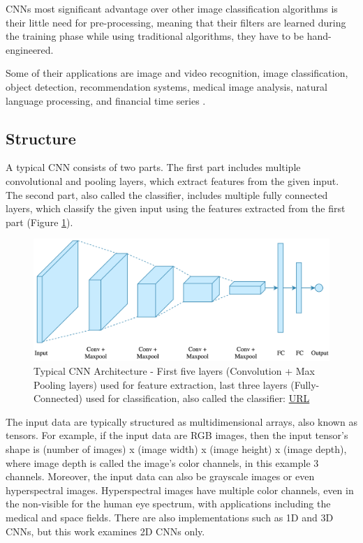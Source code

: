 CNNs most significant advantage over other image classification algorithms is their little need for pre-processing, meaning that their filters are learned during the training phase while using traditional algorithms, they have to be hand-engineered.

Some of their applications are image and video recognition, image classification, object detection, recommendation systems, medical image analysis, natural language processing, and financial time series \cite{Convolutional-neural-networks-wikipedia}.

\subsection{Structure}
A typical CNN consists of two parts. The first part includes multiple convolutional and pooling layers, which extract features from the given input. The second part, also called the classifier, includes multiple fully connected layers, which classify the given input using the features extracted from the first part (Figure \ref{fig:typical-cnn-architecture}).

\begin{figure} [ht]
	\centering
	\includegraphics[width=\textwidth]{Images/typical-cnn-architecture.png}
	\decoRule
	\caption[Typical CNN Architecture]{Typical CNN Architecture - First five layers (Convolution + Max Pooling layers) used for feature extraction, last three layers (Fully-Connected) used for classification, also called the classifier: \href{https://www.kaggle.com/mauddib/digit-recogniser-tutorial-using-a-cnn-tensorflow}{URL}}
	\label{fig:typical-cnn-architecture}
\end{figure}

The input data are typically structured as multidimensional arrays, also known as tensors. For example, if the input data are RGB images, then the input tensor's shape is (number of images) x (image width) x (image height) x (image depth), where image depth is called the image's color channels, in this example 3 channels. Moreover, the input data can also be grayscale images or even hyperspectral images. Hyperspectral images have multiple color channels, even in the non-visible for the human eye spectrum, with applications including the medical and space fields. There are also implementations such as 1D and 3D CNNs, but this work examines 2D CNNs only.

